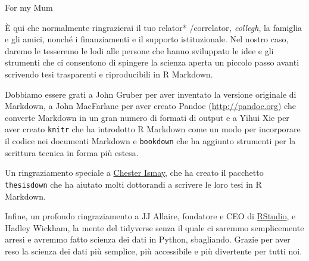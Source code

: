 \documentclass[a4paper, 11pt, nobind]{templates/ociamthesis}
\begin{document}

\begin{romanpages}

\maketitle

\begin{dedication}
  For my Mum
\end{dedication}



\begin{acknowledgements}
 	È qui che normalmente ringrazierai il tuo relator* /correlator\emph{, collegh}, la famiglia e gli amici, nonché i finanziamenti e il supporto istituzionale. Nel nostro caso, daremo le tesseremo le lodi alle persone che hanno sviluppato le idee e gli strumenti che ci consentono di spingere la scienza aperta un piccolo passo avanti scrivendo tesi trasparenti e riproducibili in R Markdown.

  Dobbiamo essere grati a John Gruber per aver inventato la versione originale di Markdown, a John MacFarlane per aver creato Pandoc (\url{http://pandoc.org}) che converte Markdown in un gran numero di formati di output e a Yihui Xie per aver creato \texttt{knitr} che ha introdotto R Markdown come un modo per incorporare il codice nei documenti Markdown e \texttt{bookdown} che ha aggiunto strumenti per la scrittura tecnica in forma più estesa.

  Un ringraziamento speciale a \href{http://chester.rbind.io}{Chester Ismay}, che ha creato il pacchetto \texttt{thesisdown} che ha aiutato molti dottorandi a scrivere le loro tesi in R Markdown.

  Infine, un profondo ringraziamento a JJ Allaire, fondatore e CEO di \href{http://rstudio.com}{RStudio}, e Hadley Wickham, la mente del tidyverse senza il quale ci saremmo semplicemente arresi e avremmo fatto scienza dei dati in Python, sbagliando. Grazie per aver reso la scienza dei dati più semplice, più accessibile e più divertente per tutti noi.


\end{acknowledgements}
\end{romanpages}
\end{document}
